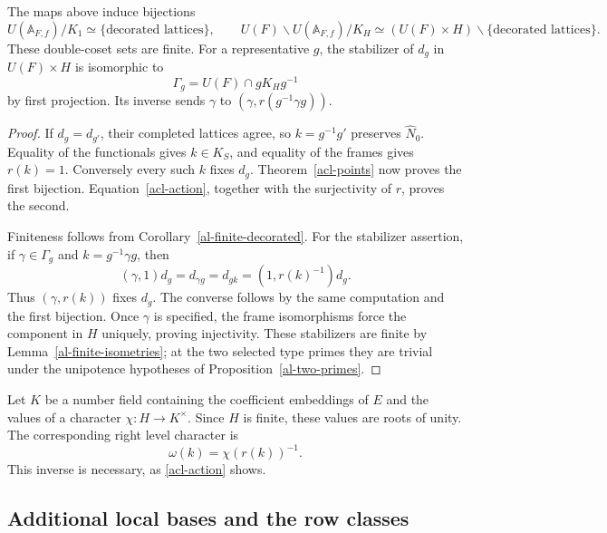 \begin{proposition}\label{acl-double-cosets}
The maps above induce bijections
\[
 U(\mathbb A_{F,f})/K_1\simeq\{\text{decorated lattices}\},
 \qquad
 U(F)\backslash U(\mathbb A_{F,f})/K_H
       \simeq (U(F)\times H)\backslash\{\text{decorated lattices}\}.
\]
These double-coset sets are finite. For a representative $g$,
the stabilizer of $d_g$ in $U(F)\times H$ is isomorphic to
\begin{equation}\label{acl-rational-stabilizer}
                         \Gamma_g=U(F)\cap gK_Hg^{-1}
\end{equation}
by first projection. Its inverse sends $\gamma$ to
$(\gamma,r(g^{-1}\gamma g))$.
\end{proposition}
\begin{proof}
If $d_g=d_{g'}$, their completed lattices agree, so
$k=g^{-1}g'$ preserves $\widehat N_0$. Equality of the
functionals gives $k\in K_S$, and equality of the frames
gives $r(k)=1$. Conversely every such $k$ fixes $d_g$.
Theorem~\ref{acl-points} now proves the first bijection.
Equation~\eqref{acl-action}, together with the surjectivity
of $r$, proves the second.

Finiteness follows from Corollary~\ref{al-finite-decorated}.
For the stabilizer assertion, if
$\gamma\in\Gamma_g$ and $k=g^{-1}\gamma g$, then
\[
                  (\gamma,1)d_g=d_{\gamma g}=d_{gk}
                                      =(1,r(k)^{-1})d_g.
\]
Thus $(\gamma,r(k))$ fixes $d_g$. The converse follows by
the same computation and the first bijection. Once $\gamma$
is specified, the frame isomorphisms force the component in
$H$ uniquely, proving injectivity. These stabilizers are finite
by Lemma~\ref{al-finite-isometries}; at the two selected type
primes they are trivial under the unipotence hypotheses of
Proposition~\ref{al-two-primes}.
\end{proof}

Let $K$ be a number field containing the coefficient embeddings
of $E$ and the values of a character $\chi:H\to K^\times$.
Since $H$ is finite, these values are roots of unity. The
corresponding right level character is
\begin{equation}\label{acl-character}
                            \omega(k)=\chi(r(k))^{-1}.
\end{equation}
This inverse is necessary, as \eqref{acl-action} shows.

\subsection{Additional local bases and the row classes}

